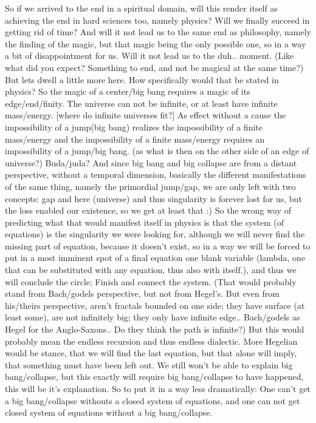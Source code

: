 \documentclass[10pt]{book}
\begin{document}
So if we arrived to the end in a spiritual domain, will this render itself as achieving the end in hard sciences too, namely physics? Will we finally succeed in getting rid of time? And will it not lead us to the same end as philosophy, namely the finding of the magic, but that magic being the only possible one, so in a way a bit of disappointment for us. Will it not lead us to the duh.. moment. (Like what did you expect? Something to end, and not be magical at the same time?) But lets dwell a little more here. How specifically would that be stated in physics?
So the magic of a center/big bang requires a magic of its edge/end/finity. The universe can not be infinite, or at least have infinite mass/energy. [where do infinite universes fit?] As effect without a cause the impossibility of a jump(big bang) realizes the impossibility of a finite mass/energy and the impossibility of a finite mass/energy requires an impossibility of a jump/big bang. (as what is then on the other side of an edge of universe?)
Buda/juda?
And since big bang and big collapse are from a distant perspective, without a temporal dimension, basically the different manifestations of the same thing, namely the primordial jump/gap, we are only left with two concepts: gap and here (universe) and thus singularity is forever lost for us, but the loss enabled our existence, so we get at least that :)
So the wrong way of predicting what that would manifest itself in physics is that the system (of equations) is the singularity we were looking for, although we will never find the missing part of equation, because it doesn't exist, so in a way we will be forced to put in a most imminent spot of a final equation one blank variable (lambda, one that can be substituted with any equation, thus also with itself.), and thus we will conclude the circle; Finish and connect the system.
(That would probably stand from Bach/godels perspective, but not from Hegel's. But even from his/theirs perspective, aren't fractals bounded on one side; they have surface (at least some), are not infinitely big; they only have infinite edge.. Bach/godels as Hegel for the Anglo-Saxons.. Do they think the path is infinite?) But this would probably mean the endless recursion and thus endless dialectic. More Hegelian would be stance, that we will find the last equation, but that alone will imply, that something must have been left out. We still won't be able to explain big bang/collapse, but this exactly will require big bang/collapse to have happened, this will be it's explanation.
So to put it in a way less dramatically: One can't get a big bang/collapse withouts a closed system of equations, and one can not get closed system of equations without a big bang/collapse. 
\end{document}
